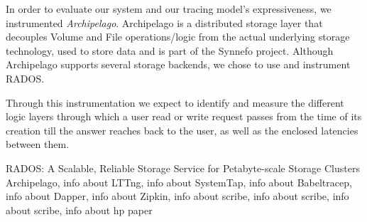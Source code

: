 \documentclass[a4paper,10pt,twocolumn]{article}
\begin{document}
In order to evaluate our system and our tracing model's expressiveness, we 
instrumented \emph{Archipelago}\cite{archip}. Archipelago is a distributed 
storage layer that decouples Volume and File operations/logic from the actual
underlying storage technology, used to store data and is part of the Synnefo 
project\cite{synnefo}. Although Archipelago supports several storage backends,
we chose to use and instrument RADOS\cite{rados}. 

Through this instrumentation we expect to identify and measure the different 
logic layers through which a user read or write request passes from the time of
its creation till the answer reaches back to the user, as well as the enclosed 
latencies between them.

\begin{thebibliography}{9}
    RADOS: A Scalable, Reliable Storage Service for Petabyte-scale
    Storage Clusters
    Archipelago,
    info about
    LTTng,
    info about
    SystemTap,
    info about
    Babeltracep,
    info about
    Dapper,
    info about
    Zipkin,
   info about
    scribe,
   info about
    scribe,
   info about
    scribe,
   info about
    hp paper
\end{thebibliography}
\end{document}
